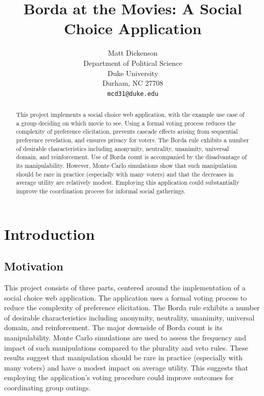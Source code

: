 \documentclass[12pt,letterpaper]{article} %
\title{Borda at the Movies: A Social Choice Application}
\author{
Matt Dickenson\\
Department of Political Science\\
Duke University\\
Durham, NC 27708 \\
\texttt{mcd31@duke.edu}
}
\begin{document}
\begin{titlepage}

\clearpage
\maketitle
\thispagestyle{empty}

\begin{abstract}
This project implements a social choice web application, with the example use case of a group deciding on which movie to see. Using a formal voting process reduces the complexity of preference elicitation, prevents cascade effects arising from sequential preference revelation, and ensures privacy for voters. The Borda rule exhibits a number of desirable characteristics including anonymity, neutrality, unanimity, universal domain, and reinforcement. Use of Borda count is accompanied by the disadvantage of its manipulability. However, Monte Carlo simulations show that such manipulation should be rare in practice (especially with many voters) and that the decreases in average utility are relatively modest. Employing this application could substantially improve the coordination process for informal social gatherings. 
\end{abstract}

\end{titlepage}



\newpage

\section{Introduction}

\subsection{Motivation}


This project consists of three parts, centered around the implementation of a social choice web application. The application uses a formal voting process to reduce the complexity of preference elicitation. The Borda rule exhibits a number of desirable characteristics including anonymity, neutrality, unanimity, universal domain, and reinforcement. The major downside of Borda count is its manipulability. Monte Carlo simulations are used to assess the frequency and impact of such manipulations compared to the plurality and veto rules. 
These results suggest that manipulation should be rare in practice (especially with many voters) and have a modest impact on average utility. This suggests that employing the application's voting procedure could improve outcomes for coordinating group outings.
\end{document}
